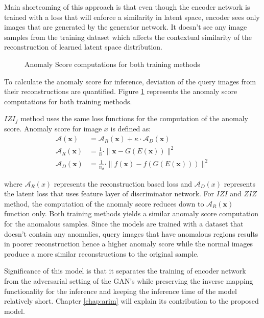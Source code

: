 {Main shortcoming of this approach is that even though the encoder network is trained with a loss that will
enforce a similarity in latent space, encoder sees only images that are generated by the generator network.
It doesn't see any image samples from the training dataset which affects the contextual similarity
of the reconstruction of learned latent space distribution. 

\begin{figure}[h!] 
	\hspace*{\fill}%
	\caption{Anomaly Score computations for both training methods \cite{pub.1111824956}}
	\label{fig:fanogan_anomaly_score}
\end{figure}

To calculate the anomaly score for inference, deviation of the query images from their
reconstructions are quantified. Figure \ref{fig:fanogan_anomaly_score} represents the anomaly score
computations for both training methods.

 $IZI_f$ method uses the same loss functions for the computation of the anomaly score. Anomaly score
 for image $x$ is defined as:
\begin{align}
	\mathcal{A}(\mathbf{x})&=\mathcal{A}_{R}(\mathbf{x})+\kappa \cdot \mathcal{A}_{D}(\mathbf{x}) \\[5pt]
	\mathcal{A}_{R}(\mathbf{x})&=\frac{1}{n} \cdot\|\mathbf{x}-G(E(\mathbf{x}))\|^{2} \\[5pt]
	\mathcal{A}_{D}(\mathbf{x})&=\frac{1}{n_{d}} \cdot\|f(\mathbf{x})-f(G(E(\mathbf{x})))\|^{2}
\end{align}

where $\mathcal{A}_R (x)$ represents the reconstruction based loss and $\mathcal{A}_{D} (x)$ represents the 
latent loss that uses feature layer of discriminator network.
For $IZI$ and $ZIZ$ method, the computation of the anomaly score reduces down to
$\mathcal{A}_{R}(\mathbf{x})$ function only. Both training methods yields a similar anomaly score
computation for the anomalous samples. Since the models are trained with a dataset that doesn't
contain any anomalies, query images that have anomalous regions results in poorer reconstruction
hence a higher anomaly score while the normal images produce a more similar reconstructions to the
original sample.
 
Significance of this model is that it separates the training of encoder network from the
adversarial setting of the GAN's while preserving the inverse mapping functionality for the
inference and keeping the inference time of the model relatively short. Chapter 
\ref{chap:arim} will explain its contribution to the proposed model.

} %

